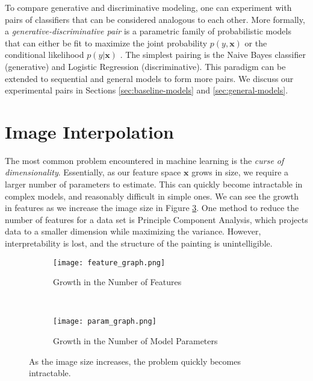 \documentclass{article}
\begin{document}
To compare generative and discriminative modeling, one can experiment
with pairs of classifiers that can be considered analogous to each other.
More formally, a \textit{generative-discriminative pair} is a parametric
family of probabilistic models that can either be fit to maximize the joint
probability $p(y, \mathbf{x})$ or the conditional
likelihood $p(y | \mathbf{x})$ \cite{NgJordan}. The simplest pairing is
the Naive Bayes classifier (generative) and Logistic Regression
(discriminative). This paradigm can be extended to sequential and general
models to form more pairs. We discuss our experimental pairs
in Sections \ref{sec:baseline-models} and \ref{sec:general-models}.




\section{Image Interpolation}
\label{sec:img-interpolation}
The most common problem encountered in machine learning is the
\textit{curse of dimensionality}. Essentially, as our feature space
$\mathbf{x}$ grows in size, we require a larger number of parameters to
estimate. This can quickly become intractable in complex models, and
reasonably difficult in simple ones. We can see the growth
in features as we increase the image size in Figure \ref{fig:feature-size}.
One method to reduce the number of
features for a data set is Principle Component Analysis, which projects
data to a smaller dimension while maximizing the variance. However,
interpretability is lost, and the structure of the painting is unintelligible.

\begin{figure}[h!]
  \centering
  \begin{subfigure}[b]{0.45\textwidth}
    \centering
    \texttt{[image: feature\_graph.png]}
    \caption{Growth in the Number of Features}
    \label{fig:feature-graph}
  \end{subfigure}
  ~
  \begin{subfigure}[b]{0.45\textwidth}
    \centering
    \texttt{[image: param\_graph.png]}
    \caption{Growth in the Number of Model Parameters}
    \label{fig:param-graph}
  \end{subfigure}
  \caption{As the image size increases, the problem quickly becomes intractable.}
  \label{fig:feature-size}
\end{figure}
\end{document}
